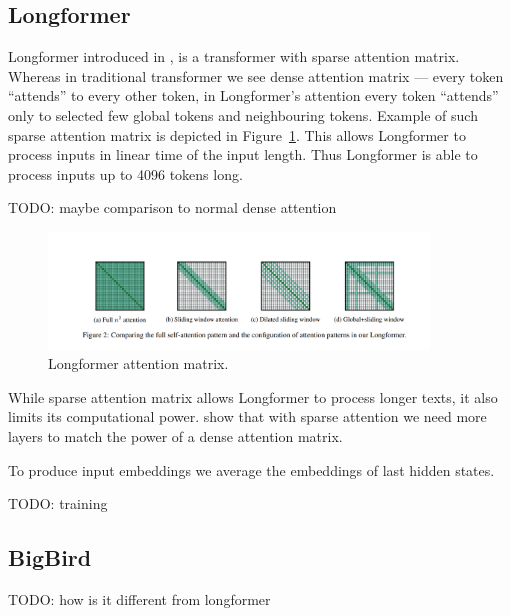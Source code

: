 \subsection{Longformer}

Longformer introduced in \cite{beltagy2020longformer}, is a transformer with
sparse attention matrix. Whereas in traditional transformer we see dense
attention matrix --- every token ``attends'' to every other token, in
Longformer's attention every token ``attends'' only to selected few global
tokens and neighbouring tokens. Example of such sparse attention matrix is
depicted in Figure~\ref{fig:longformer_sparse_att}. This allows Longformer to
process inputs in linear time of the input length. Thus Longformer is able to
process inputs up to 4096 tokens long.

TODO: maybe comparison to normal dense attention

\begin{figure}[h]
    \centering
    \includegraphics[width=0.9\textwidth]{./img/longformer_attention.png}
    \caption{Longformer attention matrix.\label{fig:longformer_sparse_att}}
\end{figure}

While sparse attention matrix allows Longformer to process longer texts, it also
limits its computational power. \cite{zaheer2020big} show that with sparse
attention we need more layers to match the power of a dense attention matrix.

To produce input embeddings we average the embeddings of last hidden states.

TODO: training

\subsection{BigBird}

TODO: how is it different from longformer




